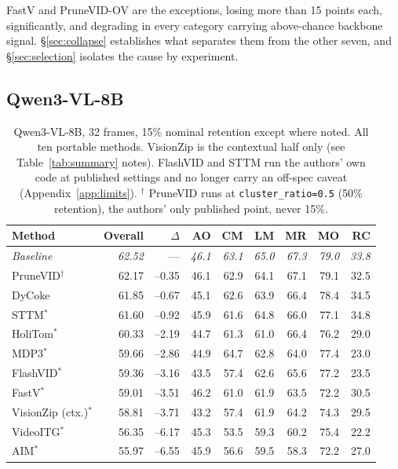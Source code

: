 \documentclass[11pt]{article}
\begin{document}
FastV and PruneVID-OV are the exceptions, losing more than 15 points each,
significantly, and degrading in every category carrying above-chance
backbone signal. \S\ref{sec:collapse} establishes what separates them from
the other seven, and \S\ref{sec:selection} isolates the cause by experiment.

\subsection{Qwen3-VL-8B}
\label{sec:qwen}

\begin{table}[H]
  \centering
  \small
  \caption{Qwen3-VL-8B, 32 frames, 15\% nominal retention except where noted.
  All ten portable methods. VisionZip is the contextual half only (see
  Table~\ref{tab:summary} notes). FlashVID and STTM run the authors' own
  code at published settings and no longer carry an off-spec caveat
  (Appendix~\ref{app:limits}). $^{\dagger}$ PruneVID runs at
  \texttt{cluster\_ratio=0.5} (50\% retention), the authors' only published
  point, never 15\%.}
  \label{tab:qwen}
  \begin{tabular}{lrrrrrrrr}
    \toprule
    Method & Overall & $\Delta$ & AO & CM & LM & MR & MO & RC \\
    \midrule
    \textit{Baseline} & \textit{62.52} & --- & \textit{46.1} & \textit{63.1} & \textit{65.0} & \textit{67.3} & \textit{79.0} & \textit{33.8} \\
    PruneVID$^{\dagger}$ & 62.17 & --0.35 & 46.1 & 62.9 & 64.1 & 67.1 & 79.1 & 32.5 \\
    DyCoke & 61.85 & --0.67 & 45.1 & 62.6 & 63.9 & 66.4 & 78.4 & 34.5 \\
    STTM$^{*}$ & 61.60 & --0.92 & 45.9 & 61.6 & 64.8 & 66.0 & 77.1 & 34.8 \\
    HoliTom$^{*}$ & 60.33 & --2.19 & 44.7 & 61.3 & 61.0 & 66.4 & 76.2 & 29.0 \\
    MDP3$^{*}$ & 59.66 & --2.86 & 44.9 & 64.7 & 62.8 & 64.0 & 77.4 & 23.0 \\
    FlashVID$^{*}$ & 59.36 & --3.16 & 43.5 & 57.4 & 62.6 & 65.6 & 77.2 & 23.5 \\
    FastV$^{*}$ & 59.01 & --3.51 & 46.2 & 61.0 & 61.9 & 63.5 & 72.2 & 30.5 \\
    VisionZip (ctx.)$^{*}$ & 58.81 & --3.71 & 43.2 & 57.4 & 61.9 & 64.2 & 74.3 & 29.5 \\
    VideoITG$^{*}$ & 56.35 & --6.17 & 45.3 & 53.5 & 59.3 & 60.2 & 75.4 & 22.2 \\
    AIM$^{*}$ & 55.97 & --6.55 & 45.9 & 56.6 & 59.5 & 58.3 & 72.2 & 27.0 \\
    \bottomrule
  \end{tabular}
\end{table}
\end{document}
